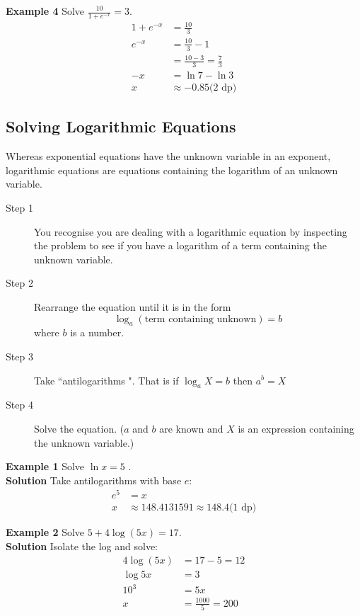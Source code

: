 \textbf{Example 4} Solve $\frac{10}{1 +e^{ -x}} =3$.
\begin{align*}1 +e^{ -x} &  = \frac{10}{3} \\
e^{ -x} &  = \frac{10}{3} -1 \\
&  = \frac{10 -3}{3} =\frac{7}{3} \\
-x &  = \ln  7 -\ln  3 \\
x &  \approx  -0.85\text{(2 dp)}\end{align*}


\subsection*{Solving Logarithmic Equations}
Whereas exponential equations have the unknown variable in an exponent, logarithmic equations are equations containing the logarithm of an unknown variable. 

\begin{description}
	\item [Step 1] You recognise you are dealing with a logarithmic equation
	by inspecting the problem to see if you have a logarithm of a term containing the unknown variable. 
	
	\item [Step	2] Rearrange the equation until it is in the form
	\begin{equation*}\log _{a} \left (\text{term containing unknown}\right ) =b
	\end{equation*} where $b$ is a number. 
	
	\item [Step 3] Take	``antilogarithms ". That is if $\log _{a} X =b$ then $a^{b} =X$ 
	
	\item [Step 4] Solve the equation.
	($a$ and $b$ are known and $X$ is an expression containing the unknown variable.) \end{description}

\textbf{Example 1} Solve $\ln  x =5$ .\\
\textbf{Solution} Take antilogarithms with base $e$:
\begin{align*}e^{5} &  = x \\
x &  \approx 148.4131591 \approx 148.4\text{(1 dp)}\end{align*}

\textbf{Example 2} Solve $5 +4 \log  \left (5 x\right ) =17$.\\
\textbf{Solution} Isolate the log and solve:
\begin{align*}4 \log  \left (5 x\right ) &  = 17 -5 =12 \\
\log  5 x &  = 3 \\
\text{}10^{3} &  = 5 x \\
x &  = \frac{1000}{5} =200\end{align*}

